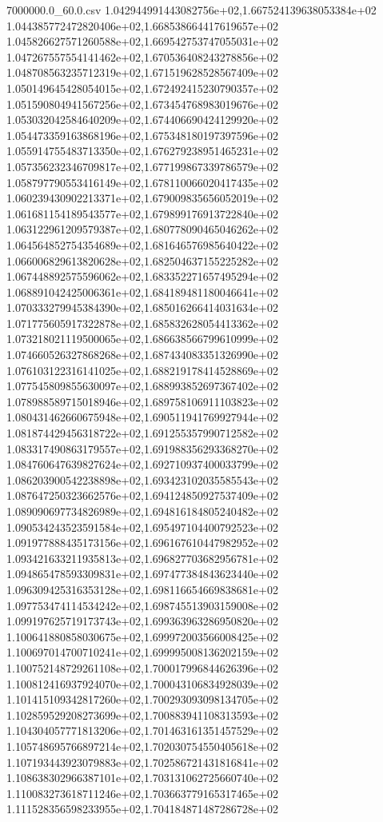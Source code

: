 \begin{filecontents*}{7000000.0_60.0.csv}
1.042944991443082756e+02,1.667524139638053384e+02
1.044385772472820406e+02,1.668538664417619657e+02
1.045826627571260588e+02,1.669542753747055031e+02
1.047267557554141462e+02,1.670536408243278856e+02
1.048708563235712319e+02,1.671519628528567409e+02
1.050149645428054015e+02,1.672492415230790357e+02
1.051590804941567256e+02,1.673454768983019676e+02
1.053032042584640209e+02,1.674406690424129920e+02
1.054473359163868196e+02,1.675348180197397596e+02
1.055914755483713350e+02,1.676279238951465231e+02
1.057356232346709817e+02,1.677199867339786579e+02
1.058797790553416149e+02,1.678110066020417435e+02
1.060239430902213371e+02,1.679009835656052019e+02
1.061681154189543577e+02,1.679899176913722840e+02
1.063122961209579387e+02,1.680778090465046262e+02
1.064564852754354689e+02,1.681646576985640422e+02
1.066006829613820628e+02,1.682504637155225282e+02
1.067448892575596062e+02,1.683352271657495294e+02
1.068891042425006361e+02,1.684189481180046641e+02
1.070333279945384390e+02,1.685016266414031634e+02
1.071775605917322878e+02,1.685832628054413362e+02
1.073218021119500065e+02,1.686638566799610999e+02
1.074660526327868268e+02,1.687434083351326990e+02
1.076103122316141025e+02,1.688219178414528869e+02
1.077545809855630097e+02,1.688993852697367402e+02
1.078988589715018946e+02,1.689758106911103823e+02
1.080431462660675948e+02,1.690511941769927944e+02
1.081874429456318722e+02,1.691255357990712582e+02
1.083317490863179557e+02,1.691988356293368270e+02
1.084760647639827624e+02,1.692710937400033799e+02
1.086203900542238898e+02,1.693423102035585543e+02
1.087647250323662576e+02,1.694124850927537409e+02
1.089090697734826989e+02,1.694816184805240482e+02
1.090534243523591584e+02,1.695497104400792523e+02
1.091977888435173156e+02,1.696167610447982952e+02
1.093421633211935813e+02,1.696827703682956781e+02
1.094865478593309831e+02,1.697477384843623440e+02
1.096309425316353128e+02,1.698116654669838681e+02
1.097753474114534242e+02,1.698745513903159008e+02
1.099197625719173743e+02,1.699363963286950820e+02
1.100641880858030675e+02,1.699972003566008425e+02
1.100697014700710241e+02,1.699995008136202159e+02
1.100752148729261108e+02,1.700017996844626396e+02
1.100812416937924070e+02,1.700043106834928039e+02
1.101415109342817260e+02,1.700293093098134705e+02
1.102859529208273699e+02,1.700883941108313593e+02
1.104304057771813206e+02,1.701463161351457529e+02
1.105748695766897214e+02,1.702030754550405618e+02
1.107193443923079883e+02,1.702586721431816841e+02
1.108638302966387101e+02,1.703131062725660740e+02
1.110083273618711246e+02,1.703663779165317465e+02
1.111528356598233955e+02,1.704184871487286728e+02

\end{filecontents*}

